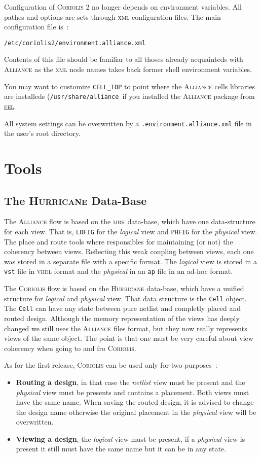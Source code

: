 \documentclass[11pt]{article}
\newcommand {\XML}                {\textsc{xml}\xspace}
\newcommand {\VHDL}               {\textsc{vhdl}\xspace}
\newcommand {\FEL}                {\href{http://spins.fedoraproject.org/fel/}{\textsc{fel}}\xspace}
\newcommand {\netlist}            {\textit{netlist}\xspace}
\newcommand {\physical}           {\textit{physical}\xspace}
\newcommand {\logical}            {\textit{logical}\xspace}
\newcommand {\Alliance}           {\textsc{Alliance}\xspace}
\newcommand {\MBK}                {\textsc{mbk}\xspace}
\newcommand {\vst}                {\texttt{vst}\xspace}
\newcommand {\ap}                 {\texttt{ap}\xspace}
\newcommand {\PHFIG}              {\texttt{PHFIG}\xspace}
\newcommand {\LOFIG}              {\texttt{LOFIG}\xspace}
\newcommand {\Coriolis}           {\textsc{Coriolis}\xspace}
\newcommand {\CoriolisII}         {\textsc{Coriolis 2}\xspace}
\newcommand {\Hurricane}          {\textsc{Hurricane}\xspace}
\newcommand {\CELLTOP}            {\texttt{CELL\_TOP}\xspace}
\newcommand {\confcoriolisIIalc}  {\texttt{/etc/coriolis2/environment.alliance.xml}\xspace}
\newcommand {\usercoriolisIIalc}  {\texttt{.environment.alliance.xml}\xspace}
\newcommand {\Cell}               {\texttt{Cell}\xspace}
\begin{document}
 Configuration of \CoriolisII no longer depends on environment variables.
 All pathes and options are sets through \XML configuration files. The main
 configuration file is~:
 \begin{center}
   \confcoriolisIIalc
 \end{center}
  Contents of this file should be familiar to all thoses already acquainteds
  with \Alliance as the \XML node names takes back former shell environment
  variables.

  You may want to customize \CELLTOP to point where the \Alliance cells
  libraries are installeds (\texttt{/usr/share/alliance}\ if you installed
  the \Alliance package from \FEL.

  All system settings can be overwritten by a \usercoriolisIIalc file in the
  user's root directory.


  \section{Tools}

  \subsection{The \Hurricane Data-Base}

  The \Alliance flow is based on the \MBK data-base, which have one data-structure
  for each view. That is, \LOFIG for the \logical view and \PHFIG for the \physical
  view. The place and route tools where responsibles for maintaining (or not) the
  coherency between views. Reflecting this weak coupling between views, each one
  was stored in a separate file with a specific format. The \logical view is stored
  in a \vst file in \VHDL format and the \physical in an \ap file in an ad-hoc format.

  The \Coriolis flow is based on the \Hurricane data-base, which have a unified
  structure for \logical and \physical view. That data structure is the \Cell object.
  The \Cell can have any state between pure netlist and completly placed and
  routed design. Although the memory representation of the views has deeply
  changed we still uses the \Alliance files format, but they now really represents
  views of the same object. The point is that one must be very careful about
  view coherency when going to and fro \Coriolis.

  As for the first release, \Coriolis can be used only for two purposes~:
  \begin{itemize}
    \item \textbf{Routing a design}\xspace, in that case the \netlist\xspace
          view must be present and the \physical view must be presents and contains
          a placement. Both views must have the same name. When saving the routed design,
          it is advised to change the design name otherwise the original placement
          in the \physical view will be overwritten.
    \item \textbf{Viewing a design}, the \logical view must be present, if a \physical
          view is present it still must have the same name but it can be in any
          state. 
  \end{itemize}
\end{document}
